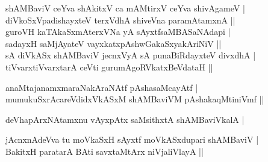 \begin{entry}
\smallskip
\begin{shl}
shAMBaviV ceYva shAkitxV ca mAMtirxV ceYva shivAgameV |\\
diVkoSxVpadishayxteV terxVdhA shiveVna paramAtamxnA ||\\
guroVH kaTAkaSxmAterxVNa yA sAyxtfsaMBASaNAdapi |\\
sadayxH saMjAyateV vayxkatxpAshwGakaSxyakAriNiV ||\\
sA diVkASx shAMBaviV jecnxVyA sA punaBiRdayxteV divxdhA |\\
tiVvarxtiVvarxtarA ceVti gurumAgoRVkatxBeVdataH ||
\end{shl}
\smallskip
{}
\smallskip
\begin{shl}
anaMtajanamxmaraNakAraNAtf pAshasaMcayAtf |\\
mumukuSxrAcareVdidxVkASxM shAMBaviVM pAshakaqMtiniVmf ||
\end{shl}
\smallskip
{}
\smallskip
{}
\end{entry}

\begin{entry}
\smallskip
\begin{shl}
deVhapArxNAtamxnu vAyxpAtx saMsithxtA shAMBaviVkalA |
\end{shl}
\smallskip
{}
\smallskip
{}
\end{entry}

\begin{entry}
\smallskip
\begin{shl}
jAcnxnAdeVva tu moVkaSxH sAyxtf moVkASxdupari shAMBaviV |\\
BakitxH paratarA BAti savxtaMtArx niVjaliVlayA ||
\end{shl}
\smallskip
{}
\end{entry}


